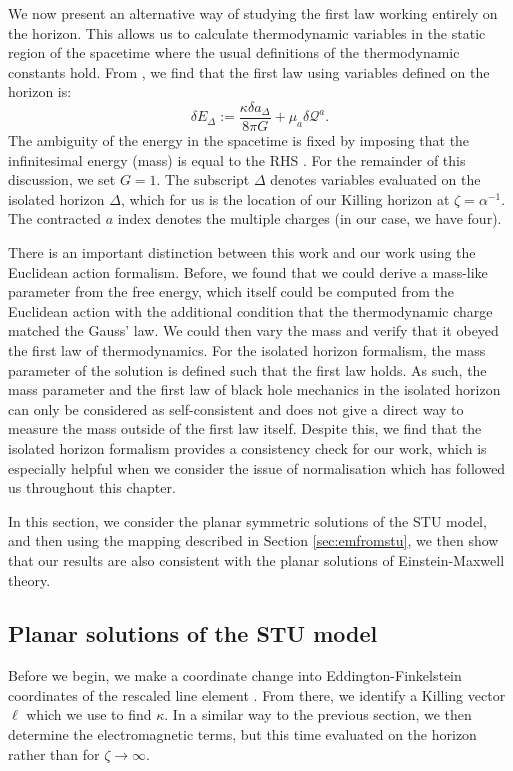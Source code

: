 We now present an alternative way of studying the first law working entirely on the horizon. This allows us to calculate thermodynamic variables in the static region of the spacetime where the usual definitions of the thermodynamic constants hold. From \cite{Ashtekar:2000hw}, we find that the first law using variables defined on the horizon is:
\begin{equation}
    \label{eq:iso1st}
    \delta E_\Delta := \frac{\kappa \delta a_\Delta}{8\pi G} + \mu_a \delta \mathcal{Q}^a.
\end{equation}
The ambiguity of the energy in the spacetime is fixed by imposing that the infinitesimal energy (mass) is equal to the RHS . For the remainder of this discussion, we set $G=1$. The subscript $\Delta$ denotes variables evaluated on the isolated horizon $\Delta$, which for us is the location of our Killing horizon at $\zeta = \alpha^{-1}$. The contracted $a$ index denotes the multiple charges (in our case, we have four). 

There is an important distinction between this work and our work using the Euclidean action formalism. Before, we found that we could derive a mass-like parameter from the free energy, which itself could be computed from the Euclidean action with the additional condition that the thermodynamic charge matched the Gauss' law. We could then vary the mass and verify that it obeyed the first law of thermodynamics. For the isolated horizon formalism, the mass parameter of the solution is defined such that the first law holds. As such, the mass parameter and the first law of black hole mechanics in the isolated horizon can only be considered as self-consistent and does not give a direct way to measure the mass outside of the first law itself. Despite this, we find that the isolated horizon formalism provides a consistency check for our work, which is especially helpful when we consider the issue of normalisation which has followed us throughout this chapter.

In this section, we consider the planar symmetric solutions of the STU model, and then using the mapping described in Section \ref{sec:emfromstu}, we then show that our results are also consistent with the planar solutions of Einstein-Maxwell theory. 

\subsection{Planar solutions of the STU model}

Before we begin, we make a coordinate change into Eddington-Finkelstein coordinates of the rescaled line element . From there, we identify a Killing vector $\ell$ which we use to find $\kappa$. In a similar way to the previous section, we then determine the electromagnetic terms, but this time evaluated on the horizon rather than for $\zeta \rightarrow \infty$. 

